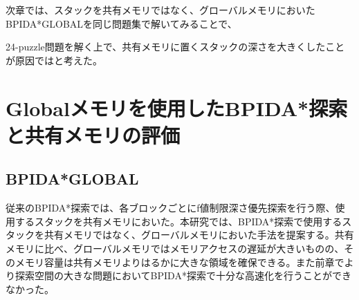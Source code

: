 \documentclass[a4paper,11pt,oneside,openany]{jsbook}
\begin{document}
次章では、スタックを共有メモリではなく、グローバルメモリにおいたBPIDA*GLOBALを同じ問題集で解いてみることで、


24-puzzle問題を解く上で、共有メモリに置くスタックの深さを大きくしたことが原因ではと考えた。






\chapter{Globalメモリを使用したBPIDA*探索と共有メモリの評価}

\section{BPIDA*GLOBAL}
従来のBPIDA*探索\cite{HA17}では、各ブロックごとにf値制限深さ優先探索を行う際、使用するスタックを共有メモリにおいた。本研究では、BPIDA*探索で使用するスタックを共有メモリではなく、グローバルメモリにおいた手法を提案する。共有メモリに比べ、グローバルメモリではメモリアクセスの遅延が大きいものの、そのメモリ容量は共有メモリよりはるかに大きな領域を確保できる。また前章でより探索空間の大きな問題においてBPIDA*探索で十分な高速化を行うことができなかった。
\end{document}
